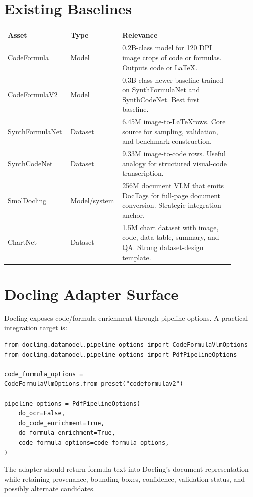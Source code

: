 \documentclass[11pt]{article}
\begin{document}
\section{Existing Baselines}

\begin{longtable}{p{0.22\linewidth} p{0.2\linewidth} p{0.48\linewidth}}
\toprule
\textbf{Asset} & \textbf{Type} & \textbf{Relevance} \\
\midrule
CodeFormula & Model & 0.2B-class model for 120 DPI image crops of code or formulas. Outputs code or \LaTeX. \\
CodeFormulaV2 & Model & 0.3B-class newer baseline trained on SynthFormulaNet and SynthCodeNet. Best first baseline. \\
SynthFormulaNet & Dataset & 6.45M image-to-\LaTeX rows. Core source for sampling, validation, and benchmark construction. \\
SynthCodeNet & Dataset & 9.33M image-to-code rows. Useful analogy for structured visual-code transcription. \\
SmolDocling & Model/system & 256M document VLM that emits DocTags for full-page document conversion. Strategic integration anchor. \\
ChartNet & Dataset & 1.5M chart dataset with image, code, data table, summary, and QA. Strong dataset-design template. \\
\bottomrule
\end{longtable}

\section{Docling Adapter Surface}

Docling exposes code/formula enrichment through pipeline options. A practical integration target is:

\begin{verbatim}
from docling.datamodel.pipeline_options import CodeFormulaVlmOptions
from docling.datamodel.pipeline_options import PdfPipelineOptions

code_formula_options = CodeFormulaVlmOptions.from_preset("codeformulav2")

pipeline_options = PdfPipelineOptions(
    do_ocr=False,
    do_code_enrichment=True,
    do_formula_enrichment=True,
    code_formula_options=code_formula_options,
)
\end{verbatim}

The adapter should return formula text into Docling's document representation while retaining provenance, bounding boxes, confidence, validation status, and possibly alternate candidates.
\end{document}
